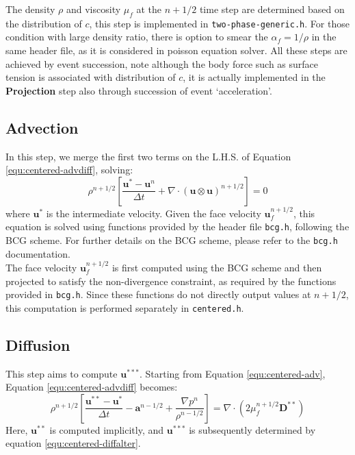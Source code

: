 The density $\rho$ and viscosity $\mu_f$ at the $n+1/2$ time step are determined based on the distribution of $c$, this step is implemented in \texttt{two-phase-generic.h}. For those condition with large density ratio, there is option to smear the $\alpha_f=1/\rho$ in the same header file, as it is considered in poisson equation solver. All these steps are achieved by event succession, note although the body force such as surface tension is associated with distribution of $c$, it is actually implemented in the \textbf{Projection} step also through succession of event `acceleration'.
\subsection{Advection}

In this step, we merge the first two terms on the L.H.S. of Equation \ref{equ:centered-advdiff}, solving:  
\begin{equation}
    \rho^{n+1/2}\left[\frac{\mathbf{u}^* - \mathbf{u}^n}{\Delta t} + \nabla\cdot(\mathbf{u}\otimes\mathbf{u})^{n+1/2}\right] = 0\label{equ:centered-adv}
\end{equation}  
where $\mathbf{u}^*$ is the intermediate velocity. Given the face velocity $\mathbf{u}^{n+1/2}_f$, this equation is solved using functions provided by the header file \texttt{bcg.h}, following the BCG scheme.  For further details on the BCG scheme, please refer to the \texttt{bcg.h} documentation.\\
The face velocity $\mathbf{u}^{n+1/2}_f$ is first computed using the BCG scheme and then projected to satisfy the non-divergence constraint, as required by the functions provided in \texttt{bcg.h}. Since these functions do not directly output values at $n+1/2$, this computation is performed separately in \texttt{centered.h}.\\

\subsection{Diffusion}
This step aims to compute $\mathbf{u}^{***}$.  
Starting from Equation \ref{equ:centered-adv}, Equation \ref{equ:centered-advdiff} becomes:  
\begin{equation}
    \rho^{n+1/2} \left[ \frac{\mathbf{u}^{**} - \mathbf{u}^*}{\Delta t}  
    - \mathbf{a}^{n-1/2} 
    + \frac{\nabla p^n}{\rho^{n-1/2}} \right] 
    = \nabla \cdot \left( 2\mu^{n+1/2}_f \mathbf{D}^{**} \right)\label{equ:centered-diff}
\end{equation}  
Here, $\mathbf{u}^{**}$ is computed implicitly, and $\mathbf{u}^{***}$ is subsequently determined by equation \ref{equ:centered-diffalter}.

